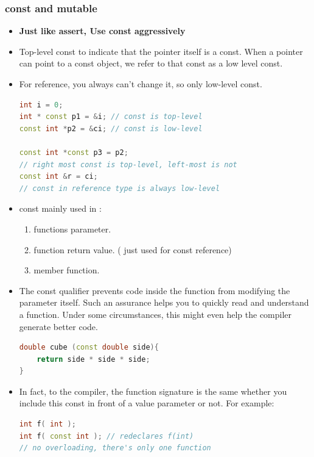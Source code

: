 \documentclass[a4paper,12pt,twoside]{book}
\begin{document}
\subsubsection{const and mutable}
\begin{itemize}
\item \textbf{Just like assert, Use const aggressively}

\item Top-level const to indicate that the pointer itself is a const. When a pointer can point to a const object, we refer to that const as a low level const.

\item For reference, you always can't change it, so only low-level const.
\begin{lstlisting}[frame=single, language=c++]
int i = 0;
int * const p1 = &i; // const is top-level
const int *p2 = &ci; // const is low-level

const int *const p3 = p2;
// right most const is top-level, left-most is not
const int &r = ci;
// const in reference type is always low-level
\end{lstlisting}


\item const mainly used in :
\begin{enumerate}
\item functions parameter.
\item function return value. ( just used for const reference)
\item member function.
\end{enumerate}

\item The const qualifier prevents code inside the function from modifying the parameter itself. Such an assurance helps you to quickly read and understand a function. Under some circumstances, this might even help the compiler generate better code.
\begin{lstlisting}[frame=single, language=c++]
double cube (const double side){
    return side * side * side;
}
\end{lstlisting}

\item In fact, to the compiler, the function signature is the same whether you include this const in front
of a value parameter or not. For example:
\begin{lstlisting}[frame=single, language=c++]
int f( int );
int f( const int ); // redeclares f(int)
// no overloading, there's only one function
\end{lstlisting}


\end{itemize}
\end{document}
